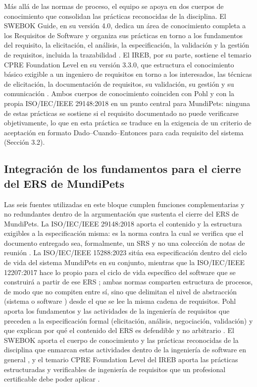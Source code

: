 \documentclass[journal,onecolumn]{IEEEtran}
\begin{document}
Más allá de las normas de proceso, el equipo se apoya en dos cuerpos de conocimiento que consolidan
las prácticas reconocidas de la disciplina. El SWEBOK Guide, en su versión 4.0, dedica un área de
conocimiento completa a los Requisitos de Software y organiza sus prácticas en torno a los
fundamentos del requisito, la elicitación, el análisis, la especificación, la validación y la gestión
de requisitos, incluida la trazabilidad \cite{swebok2024}. El IREB, por su parte, sostiene el temario
CPRE Foundation Level en su versión 3.3.0, que estructura el conocimiento básico exigible a un
ingeniero de requisitos en torno a los interesados, las técnicas de elicitación, la documentación de
requisitos, su validación, su gestión y su comunicación \cite{ireb2026}. Ambos cuerpos de conocimiento
coinciden con Pohl y con la propia ISO/IEC/IEEE 29148:2018 en un punto central para MundiPets: ninguna
de estas prácticas se sostiene si el requisito documentado no puede verificarse objetivamente, lo que
en esta práctica se traduce en la exigencia de un criterio de aceptación en formato
Dado--Cuando--Entonces para cada requisito del sistema (Sección 3.2).

\subsection{Integración de los fundamentos para el cierre del ERS de MundiPets}

Las seis fuentes utilizadas en este bloque cumplen funciones complementarias y no redundantes dentro
de la argumentación que sustenta el cierre del ERS de MundiPets. La ISO/IEC/IEEE 29148:2018 aporta el
contenido y la estructura exigibles a la especificación misma: es la norma contra la cual se verifica
que el documento entregado sea, formalmente, un SRS y no una colección de notas de reunión
\cite{ieee29148}. La ISO/IEC/IEEE 15288:2023 sitúa esa especificación dentro del ciclo de vida del
sistema MundiPets en su conjunto, mientras que la ISO/IEC/IEEE 12207:2017 hace lo propio para el ciclo
de vida específico del software que se construirá a partir de ese ERS \cite{iso15288,iso12207}; ambas
normas comparten estructura de procesos, de modo que no compiten entre sí, sino que delimitan el nivel
de abstracción  (sistema o software ) desde el que se lee la misma cadena de requisitos. Pohl
aporta los fundamentos y las actividades de la ingeniería de requisitos que preceden a la
especificación formal (elicitación, análisis, negociación, validación) y que explican por qué el
contenido del ERS es defendible y no arbitrario \cite{pohl2025}. El SWEBOK aporta el cuerpo de
conocimiento y las prácticas reconocidas de la disciplina que enmarcan estas actividades dentro de la
ingeniería de software en general \cite{swebok2024}, y el temario CPRE Foundation Level del IREB aporta
las prácticas estructuradas y verificables de ingeniería de requisitos que un profesional certificable
debe poder aplicar \cite{ireb2026}.
\end{document}
